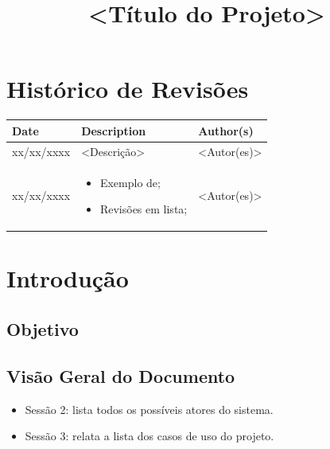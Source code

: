 \documentclass{article}
\title{<Título do Projeto>}
\begin{document}
\newpage

\section*{\center Histórico de Revisões}
  \vspace*{1cm}
  \begin{table}[ht]
    \centering
    \begin{tabular}[pos]{|m{2cm} | m{7.2cm} | m{3.8cm}|} 
      \hline
      \cellcolor[gray]{0.9}
      \textbf{Date} & \cellcolor[gray]{0.9}\textbf{Description} & \cellcolor[gray]{0.9}\textbf{Author(s)}\\ \hline
      \hline
      \small xx/xx/xxxx & \small <Descrição> & \small <Autor(es)> \\ \hline      
      \small xx/xx/xxxx &
      \begin{small}
        \begin{itemize}
          \item Exemplo de;
          \item Revisões em lista;
        \end{itemize}
      \end{small} & \small <Autor(es)> \\ \hline 
    \end{tabular}
  \end{table}

\newpage

\tableofcontents
\newpage

\section{Introdução}

  \subsection{Objetivo}
  
  \subsection{Visão Geral do Documento}
  \begin{itemize}
    \item Sessão 2: lista todos os possíveis atores do sistema.
    \item Sessão 3: relata a lista dos casos de uso do projeto.
  \end{itemize}
  
\end{document}
